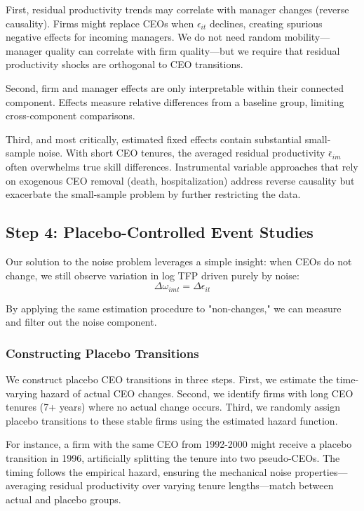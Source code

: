 \documentclass[11pt,a4paper]{article}
\begin{document}
First, residual productivity trends may correlate with manager changes (reverse causality). Firms might replace CEOs when $\epsilon_{it}$ declines, creating spurious negative effects for incoming managers. We do not need random mobility—manager quality can correlate with firm quality—but we require that residual productivity shocks are orthogonal to CEO transitions.

Second, firm and manager effects are only interpretable within their connected component. Effects measure relative differences from a baseline group, limiting cross-component comparisons.

Third, and most critically, estimated fixed effects contain substantial small-sample noise. With short CEO tenures, the averaged residual productivity $\bar{\epsilon}_{im}$ often overwhelms true skill differences. Instrumental variable approaches that rely on exogenous CEO removal (death, hospitalization) address reverse causality but exacerbate the small-sample problem by further restricting the data.

\subsection{Step 4: Placebo-Controlled Event Studies}

Our solution to the noise problem leverages a simple insight: when CEOs do not change, we still observe variation in log TFP driven purely by noise:
\begin{equation}
\Delta\omega_{imt} = \Delta\epsilon_{it}
\end{equation}

By applying the same estimation procedure to "non-changes," we can measure and filter out the noise component.

\subsubsection{Constructing Placebo Transitions}

We construct placebo CEO transitions in three steps. First, we estimate the time-varying hazard of actual CEO changes. Second, we identify firms with long CEO tenures (7+ years) where no actual change occurs. Third, we randomly assign placebo transitions to these stable firms using the estimated hazard function.

For instance, a firm with the same CEO from 1992-2000 might receive a placebo transition in 1996, artificially splitting the tenure into two pseudo-CEOs. The timing follows the empirical hazard, ensuring the mechanical noise properties—averaging residual productivity over varying tenure lengths—match between actual and placebo groups.
\end{document}
